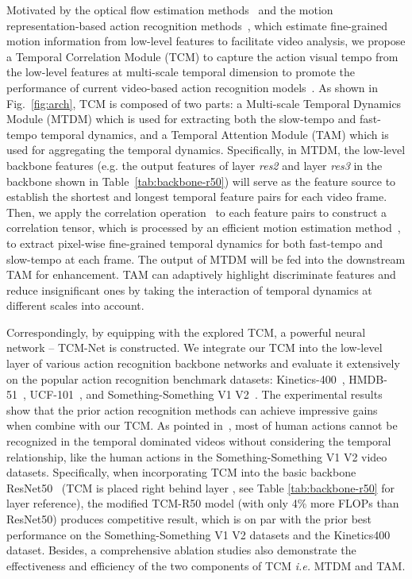 \documentclass[journal]{IEEEtran}
\begin{document}
Motivated by the optical flow estimation methods~\cite{tuDeepNLF,sun2018pwc,t2021liteflownet} and the motion representation-based action recognition methods~\cite{piergiovanni2019representation,kwon2020motionsqueeze,chen2020temporalc}, which estimate fine-grained motion information from low-level features to facilitate video analysis, we propose a Temporal Correlation Module (TCM) to capture the action visual tempo from the low-level features at multi-scale temporal dimension to promote the performance of current video-based action recognition models~\cite{zheng2020dynamic,ji2019context,liu2021tam}. 
As shown in Fig.~\ref{fig:arch}, TCM is composed of two parts: a Multi-scale Temporal Dynamics Module (MTDM) which is used for extracting both the slow-tempo and fast-tempo temporal dynamics, and a Temporal Attention Module (TAM) which is used for aggregating the temporal dynamics. Specifically, in MTDM, the low-level backbone features (e.g. the output features of layer \textit{res2} and layer \textit{res3} in the backbone shown in Table~\ref{tab:backbone-r50}) will serve as the feature source to establish the shortest and longest temporal feature pairs for each video frame. Then, we apply the correlation operation~\cite{dosovitskiy2015flownet} to each feature pairs to construct a correlation tensor, which is processed by an efficient motion estimation method~\cite{kwon2020motionsqueeze}, to extract pixel-wise fine-grained temporal dynamics for both fast-tempo and slow-tempo at each frame. The output of MTDM will be fed into the downstream TAM for enhancement. TAM can adaptively highlight discriminate features and reduce insignificant ones by taking the interaction of temporal dynamics at different scales into account.

Correspondingly, by equipping with the explored TCM, a powerful neural network -- TCM-Net is constructed. We integrate our TCM into the low-level layer of various action recognition backbone networks and evaluate it extensively on the popular action recognition benchmark datasets: Kinetics-400~\cite{kay2017kinetics}, HMDB-51~\cite{Kuehne11}, UCF-101~\cite{soomro2012ucf101}, and Something-Something V1  V2~\cite{goyal2017something}. The experimental results show that the prior action recognition methods can achieve impressive gains when combine with our TCM. As pointed in~\cite{jiang2019stm, li2020tea,lin2019tsm}, most of human actions cannot be recognized in the temporal dominated videos without considering the temporal relationship, like the human actions in the Something-Something V1  V2 video datasets. Specifically, when incorporating TCM into the basic backbone ResNet50~\cite{he2016deep} (TCM is placed right behind layer , see Table \ref{tab:backbone-r50} for layer reference), the modified TCM-R50 model (with only 4\% more FLOPs than ResNet50) produces competitive result, which is on par with the prior best performance on the Something-Something V1  V2 datasets and the Kinetics400 dataset. Besides, a comprehensive ablation studies also demonstrate the effectiveness and efficiency of the two components of TCM \textit{i.e.} MTDM and TAM.
\end{document}
